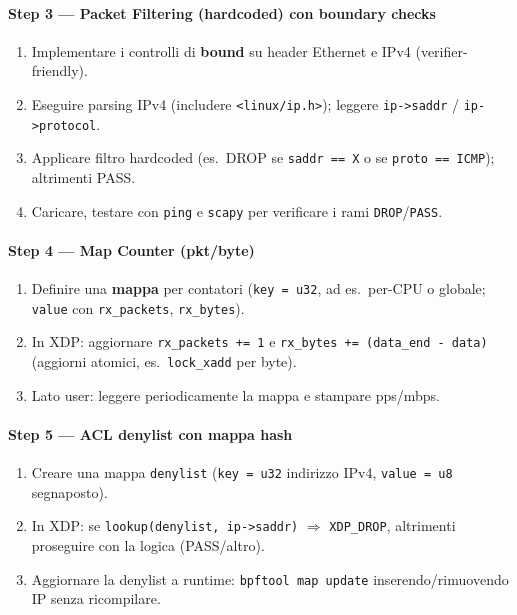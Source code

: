 \paragraph{Step 3 — Packet Filtering (hardcoded) con boundary checks}
\begin{enumerate}
  \item Implementare i controlli di \textbf{bound} su header Ethernet e IPv4 (verifier-friendly).
  \item Eseguire parsing IPv4 (includere \texttt{<linux/ip.h>}); leggere \texttt{ip->saddr} / \texttt{ip->protocol}.
  \item Applicare filtro hardcoded (es.\ DROP se \texttt{saddr == X} o se \texttt{proto == ICMP}); altrimenti PASS.
  \item Caricare, testare con \texttt{ping} e \texttt{scapy} per verificare i rami \texttt{DROP}/\texttt{PASS}.
\end{enumerate}

\paragraph{Step 4 — Map Counter (pkt/byte)}
\begin{enumerate}
  \item Definire una \textbf{mappa} per contatori (\texttt{key = u32}, ad es.\ per-CPU o globale; \texttt{value} con \texttt{rx\_packets}, \texttt{rx\_bytes}).
  \item In XDP: aggiornare \texttt{rx\_packets += 1} e \texttt{rx\_bytes += (data\_end - data)} (aggiorni atomici, es.\ \texttt{lock\_xadd} per byte).
  \item Lato user: leggere periodicamente la mappa e stampare pps/mbps.
\end{enumerate}

\paragraph{Step 5 — ACL denylist con mappa hash}
\begin{enumerate}
  \item Creare una mappa \texttt{denylist} (\texttt{key = u32} indirizzo IPv4, \texttt{value = u8} segnaposto).
  \item In XDP: se \texttt{lookup(denylist, ip->saddr)} \(\Rightarrow\) \texttt{XDP\_DROP}, altrimenti proseguire con la logica (PASS/altro).
  \item Aggiornare la denylist a runtime: \texttt{bpftool map update} inserendo/rimuovendo IP senza ricompilare.
\end{enumerate}

